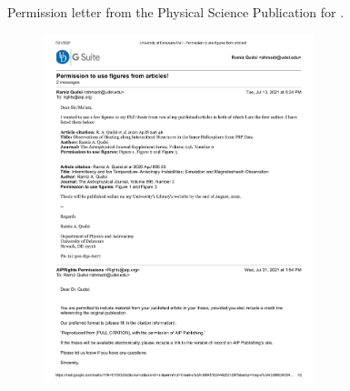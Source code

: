 %
%
 \label{apdx:D}

    Permission letter from the Physical Science Publication for
    .
    \begin{figure}[h!]
        \begin{center}
            \includegraphics[width=0.7\textwidth]{figures/apdxD/apj_permission_letter.pdf}
            \captionsetup{labelformat=empty}
            \caption[]{}
            \label{fig:prmsn_ltr}
        \end{center}
    \end{figure}